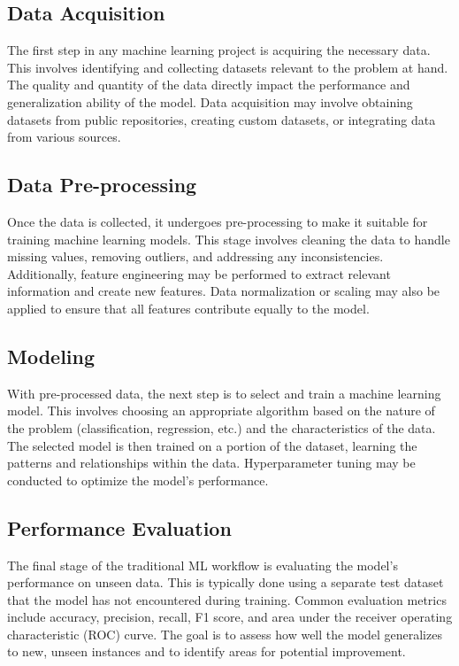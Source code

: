 \documentclass[12pt,a4paper,openright,twoside]{book}
\begin{document}
\subsection{Data Acquisition}

The first step in any machine learning project is acquiring the necessary data. This involves identifying and collecting datasets relevant to the problem at hand. The quality and quantity of the data directly impact the performance and generalization ability of the model. Data acquisition may involve obtaining datasets from public repositories, creating custom datasets, or integrating data from various sources.

\subsection{Data Pre-processing}

Once the data is collected, it undergoes pre-processing to make it suitable for training machine learning models. This stage involves cleaning the data to handle missing values, removing outliers, and addressing any inconsistencies. Additionally, feature engineering may be performed to extract relevant information and create new features. Data normalization or scaling may also be applied to ensure that all features contribute equally to the model.

\subsection{Modeling}

With pre-processed data, the next step is to select and train a machine learning model. This involves choosing an appropriate algorithm based on the nature of the problem (classification, regression, etc.) and the characteristics of the data. The selected model is then trained on a portion of the dataset, learning the patterns and relationships within the data. Hyperparameter tuning may be conducted to optimize the model's performance.

\subsection{Performance Evaluation}

The final stage of the traditional ML workflow is evaluating the model's performance on unseen data. This is typically done using a separate test dataset that the model has not encountered during training. Common evaluation metrics include accuracy, precision, recall, F1 score, and area under the receiver operating characteristic (ROC) curve. The goal is to assess how well the model generalizes to new, unseen instances and to identify areas for potential improvement.
\end{document}
